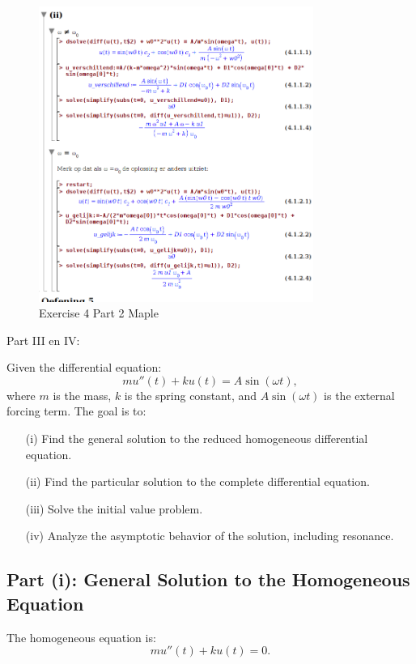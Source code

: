 \documentclass[a4paper]{report}
\begin{document}
\begin{figure}[H]
	\centering
	\includegraphics[width=0.8\textwidth]{assets/bord_8_ex_4_part_2_maple.png}
	\caption{Exercise 4 Part 2 Maple}
	\label{fig:bord_8_ex_4_part_2_maple}
\end{figure}

Part III en IV:

Given the differential equation:
\[
	m u''(t) + k u(t) = A \sin(\omega t),
\]
where \(m\) is the mass, \(k\) is the spring constant, and \(A \sin(\omega t)\) is the external forcing term. The goal is to:

\begin{enumerate}
	\item[(i)] Find the general solution to the reduced homogeneous differential equation.
	\item[(ii)] Find the particular solution to the complete differential equation.
	\item[(iii)] Solve the initial value problem.
	\item[(iv)] Analyze the asymptotic behavior of the solution, including resonance.
\end{enumerate}

\subsection*{Part (i): General Solution to the Homogeneous Equation}

The homogeneous equation is:
\[
	m u''(t) + k u(t) = 0.
\]
\end{document}
